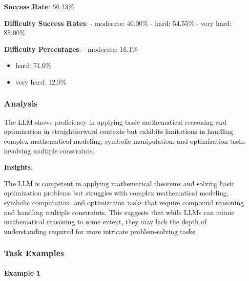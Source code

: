 \documentclass[fleqn,10pt]{wlscirep}
\begin{document}
\textbf{Success Rate}: 56.13\%

\textbf{Difficulty Success Rates}: - moderate: 40.00\% - hard: 54.55\% -
very hard: 85.00\%

\textbf{Difficulty Percentages}: - moderate: 16.1\%

\begin{itemize}
\item
  hard: 71.0\%
\item
  very hard: 12.9\%
\end{itemize}

\hypertarget{analysis-19}{%
\subsubsection{Analysis}\label{analysis-19}}

The LLM shows proficiency in applying basic mathematical reasoning and
optimization in straightforward contexts but exhibits limitations in
handling complex mathematical modeling, symbolic manipulation, and
optimization tasks involving multiple constraints.

\textbf{Insights}:

The LLM is competent in applying mathematical theorems and solving basic
optimization problems but struggles with complex mathematical modeling,
symbolic computation, and optimization tasks that require compound
reasoning and handling multiple constraints. This suggests that while
LLMs can mimic mathematical reasoning to some extent, they may lack the
depth of understanding required for more intricate problem-solving
tasks.

\hypertarget{task-examples-20}{%
\subsubsection{Task Examples}\label{task-examples-20}}

\hypertarget{example-1-20}{%
\paragraph{Example 1}\label{example-1-20}}
\end{document}
